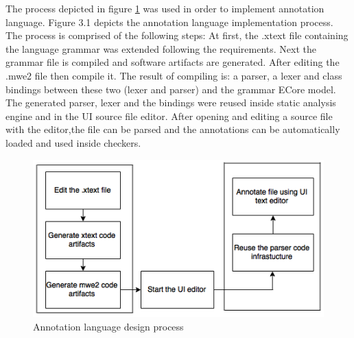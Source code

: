 The process depicted in figure \ref{figure:Language_Design_Process} was used in order to
implement annotation language. Figure 3.1 depicts the
annotation language implementation process. The process is
comprised of the following steps: At first, the .xtext file
containing the language grammar was extended following the requirements. Next the grammar file is compiled and software artifacts are generated. After editing the .mwe2 file then compile it. The result of compiling is: a parser, a lexer and class bindings between these two (lexer and parser) and the grammar ECore model. The generated parser, lexer and the bindings were reused inside static analysis engine and in the UI source file editor. After opening and editing a source file with the editor,the file can be parsed and the annotations can be automatically loaded and used inside checkers.
\begin{figure}[htbp]
	\centering
	\includegraphics{styles/Language_Design_Process.png}
	\caption{Annotation language design process}
	\label{figure:Language_Design_Process}
\end{figure}